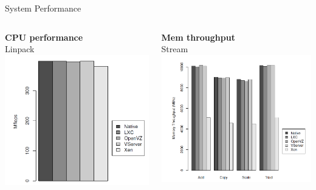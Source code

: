 \begin{frame}{System Performance}
	\begin{columns}[T]
		\begin{column}{.5\textwidth}
			\begin{block}{\centering \textbf{CPU performance} \\ Linpack}
				\includegraphics[width=\textwidth]{img/cpu_perf_linpack.png}
			\end{block}
		\end{column}
		\begin{column}{.5\textwidth}
			\begin{block}{\centering \textbf{Mem throughput} \\ Stream}
				\includegraphics[width=\textwidth]{img/mem_throughput_stream.png}
			\end{block}
		\end{column}
	\end{columns}
\end{frame}

